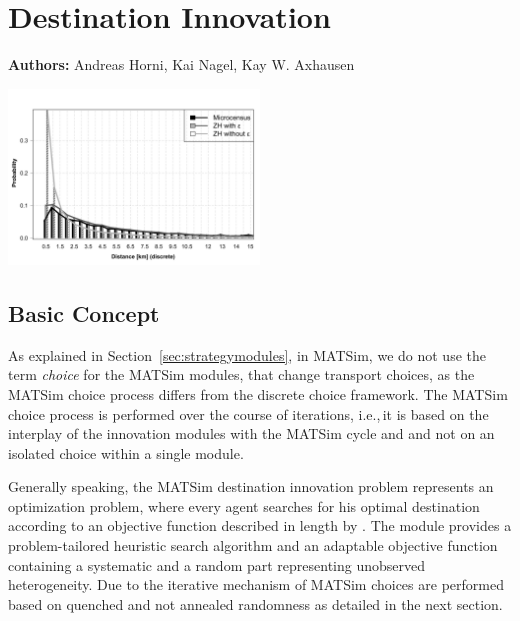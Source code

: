 \chapter{Destination Innovation}
\label{ch:destinationchoice}
\hfill \textbf{Authors:} Andreas Horni, Kai Nagel, Kay W. Axhausen

\begin{center} \includegraphics[width=0.5\textwidth, angle=0]{extending/figures/dc/zhLeisure.pdf} \end{center}


\section{Basic Concept}
As explained in Section~\ref{sec:strategymodules}, in MATSim, we do not use the term \emph{choice} for the MATSim modules, that change transport choices, as the MATSim choice process differs from the discrete choice framework. The MATSim choice process is performed over the course of iterations, i.e.,\,it is based on the interplay of the innovation modules with the MATSim cycle and and not on an isolated choice within a single module. 

Generally speaking, the MATSim destination innovation problem represents an optimization problem, where every agent searches for his optimal destination according to an objective function described in length by \citet[][]{Horni_PhDThesis_2013, HorniEtAl_unpub_TRB_2012}. The module provides a problem-tailored heuristic search algorithm and an adaptable objective function containing a systematic and a random part representing unobserved heterogeneity. Due to the iterative mechanism of MATSim choices are performed based on quenched and not annealed randomness as detailed in the next section. 

